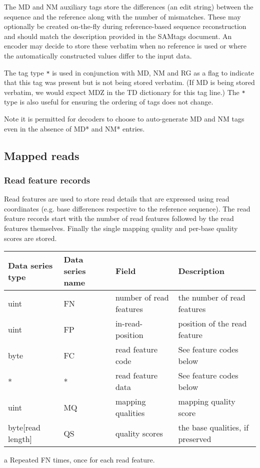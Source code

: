 \documentclass[a4paper]{article}
\begin{document}
The MD and NM auxiliary tags store the differences (an edit string) between the sequence and the reference along with the number of mismatches.
These may optionally be created on-the-fly during reference-based sequence reconstruction and should match the description provided in the SAMtags document.
An encoder may decide to store these verbatim when no reference is used or where the automatically constructed values differ to the input data.

The tag type \texttt{*} is used in conjunction with MD, NM and RG as a flag to indicate that this tag was present but is not being stored verbatim.
(If MD is being stored verbatim, we would expect MDZ in the TD dictionary for this tag line.)
The \texttt{*} type is also useful for ensuring the ordering of tags does not change.

Note it is permitted for decoders to choose to auto-generate MD and NM tags even in the absence of MD* and NM* entries.

\subsection{\textbf{Mapped reads}}
\label{subsec:mapped}

\subsubsection*{\textbf{Read feature records}}
\label{subsec:features}

Read features are used to store read details that are expressed using read coordinates 
(e.g. base differences respective to the reference sequence). The read feature 
records start with the number of read features followed by the read features themselves.
Finally the single mapping quality and per-base quality scores are stored.

\begin{threeparttable}[t]
\begin{tabular}{|>{\raggedright}p{88pt}|>{\raggedright}p{83pt}|>{\raggedright}p{85pt}|>{\raggedright}p{180pt}|}
\hline
\textbf{Data series type} & \textbf{Data series name} & \textbf{Field} & \textbf{Description}\tabularnewline
\hline
uint & FN & number of read features & the number of read features\tabularnewline
\hline
uint & FP & in-read-position\tnote{a} & position of the read feature\tabularnewline 
\hline
byte & FC & read feature code\tnote{a} & See feature codes below\tabularnewline
\hline
* & * & read feature data\tnote{a} & See feature codes below\tabularnewline
\hline
uint & MQ & mapping qualities & mapping quality score\tabularnewline
\hline
byte[read length] & QS & quality scores & the base qualities, if preserved\tabularnewline
\hline
\end{tabular}
\begin{tablenotes}
\item[a] Repeated FN times, once for each read feature.
\end{tablenotes}
\end{threeparttable}
\end{document}
